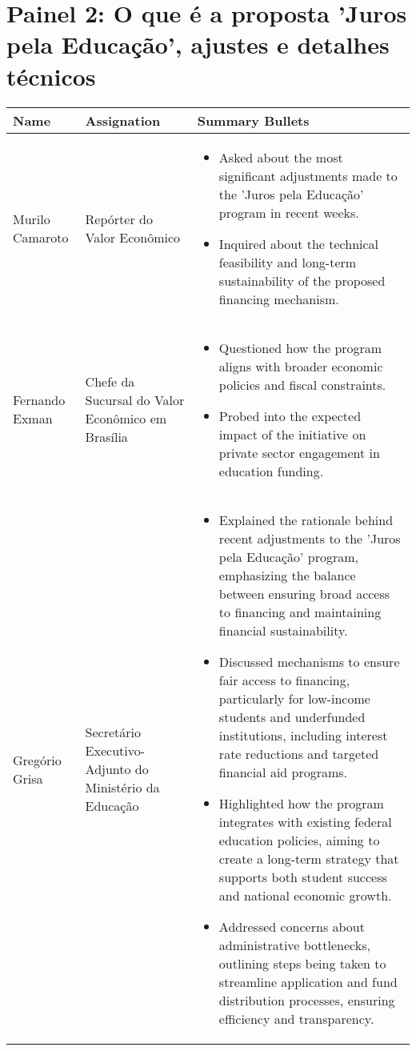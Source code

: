 \documentclass[a4paper,10pt]{article}
\begin{document}
\section*{Painel 2: O que é a proposta 'Juros pela Educação', ajustes e detalhes técnicos}

\begin{table}[htbp!]
\centering
\renewcommand{\arraystretch}{1.2}
\begin{tabular}{|p{1in}|p{1.4in}|p{4.2in}|}
\hline
Name & Assignation & Summary Bullets \\
\hline
Murilo Camaroto & Repórter do Valor Econômico & \begin{itemize}
\item Asked about the most significant adjustments made to the 'Juros pela Educação' program in recent weeks.
\item Inquired about the technical feasibility and long-term sustainability of the proposed financing mechanism.
\end{itemize}\\
\hline
Fernando Exman & Chefe da Sucursal do Valor Econômico em Brasília & \begin{itemize}
\item Questioned how the program aligns with broader economic policies and fiscal constraints.
\item Probed into the expected impact of the initiative on private sector engagement in education funding.
\end{itemize}\\
\hline
Gregório Grisa & Secretário Executivo-Adjunto do Ministério da Educação & \begin{itemize}
\item Explained the rationale behind recent adjustments to the 'Juros pela Educação' program, emphasizing the balance between ensuring broad access to financing and maintaining financial sustainability.
\item Discussed mechanisms to ensure fair access to financing, particularly for low-income students and underfunded institutions, including interest rate reductions and targeted financial aid programs.
\item Highlighted how the program integrates with existing federal education policies, aiming to create a long-term strategy that supports both student success and national economic growth.
\item Addressed concerns about administrative bottlenecks, outlining steps being taken to streamline application and fund distribution processes, ensuring efficiency and transparency.

\end{itemize}
\end{tabular}
\end{table}
\end{document}
